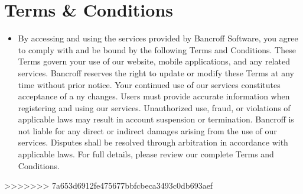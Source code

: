 \documentclass{article}
\begin{document}
    \section{Terms \& Conditions}
    \begin{itemize}
        \item 
        By accessing and using the services provided by Bancroff Software, 
        you agree to comply with and be bound by the following Terms and 
        Conditions. These Terms govern your use of our website, 
        mobile applications, and any related services. Bancroff reserves
         the right to update or modify these Terms at any time without prior 
         notice. Your continued use of our services constitutes acceptance of a
         ny changes. Users must provide accurate information when registering 
         and using our services. Unauthorized use, fraud, or violations of 
         applicable laws may result in account suspension or termination. 
         Bancroff is not liable for any direct or indirect damages arising from 
         the use of our services. Disputes shall be resolved through 
         arbitration in accordance with applicable laws. 
        For full details, please review our complete Terms and Conditions.
    \end{itemize} 

>>>>>>> 7a653d6912fe475677bbfcbeca3493c0db693aef
\end{document}
